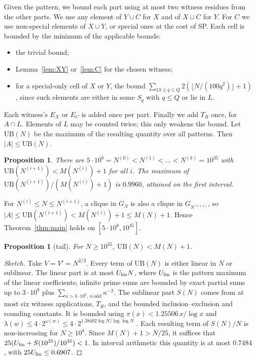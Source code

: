 \documentclass[11pt]{amsart}
\newtheorem{proposition}[theorem]{Proposition}
\theoremstyle{definition}
\theoremstyle{remark}
\begin{document}
Given the pattern, we bound each part using at most two witness residues from the other parts. We use any
element of $Y\cup C$ for $X$ and of $X\cup C$ for $Y$. For $C$ we use non-special elements of $X\cup Y$, or
special ones at the cost of SP. Each cell is bounded by the minimum of the applicable bounds:
\begin{itemize}
\item the trivial bound;
\item Lemma~\ref{lem:XY} or~\ref{lem:C} for the chosen witness;
\item for a special-only cell of $X$ or $Y$, the bound $\sum_{13\le q\le Q}2(\lfloor N/(100q^2)\rfloor+1)$,
  since such elements are either in some $S_q$ with $q\le Q$ or lie in $L$.
\end{itemize}
Each witness's $E_X$ or $E_C$ is added once per part. Finally we add $T_R$ once, for $A\cap L$. Elements of
$L$ may be counted twice; this only weakens the bound. Let $\mathrm{UB}(N)$ be the maximum of the resulting
quantity over all patterns. Then $|A|\le\mathrm{UB}(N)$.

\begin{proposition}\label{prop:grid}
There are $5\cdot10^8=N^{(0)}<N^{(1)}<\dots<N^{(k)}=10^{35}$ with
$\mathrm{UB}(N^{(i+1)})<M(N^{(i)})+1$ for all $i$. The maximum of
$\mathrm{UB}(N^{(i+1)})/(M(N^{(i)})+1)$ is $0.9960$, attained on the first interval.
\end{proposition}

For $N^{(i)}\le N\le N^{(i+1)}$, a clique in $G_N$ is also a clique in $G_{N^{(i+1)}}$, so
$|A|\le\mathrm{UB}(N^{(i+1)})<M(N^{(i)})+1\le M(N)+1$. Hence Theorem~\ref{thm:main} holds on
$[5\cdot10^8,10^{35}]$.

\begin{proposition}[tail]\label{prop:tail}
For $N\ge10^{35}$, $\mathrm{UB}(N)<M(N)+1$.
\end{proposition}
\begin{proof}[Sketch]
Take $V=V'=N^{2/3}$. Every term of $\mathrm{UB}(N)$ is either linear in $N$ or sublinear. The linear part is at
most $U_{\rm lin}N$, where $U_{\rm lin}$ is the pattern maximum of the linear coefficients; infinite prime sums
are bounded by exact partial sums up to $3\cdot10^8$ plus $\sum_{n>3\cdot10^8,\,n\ \text{odd}}n^{-2}$. The
sublinear part $S(N)$ comes from at most six witness applications, $T_R$, and the bounded inclusion--exclusion
and rounding constants. It is bounded using $\pi(x)<1.25506\,x/\log x$ \cite{RS62} and
$\lambda(w)\le4\cdot2^{\omega(w)}\le4\cdot2^{1.38402\log N/\log\log N}$ \cite{Ro83}. Each resulting term of
$S(N)/N$ is non-increasing for $N\ge10^8$. Since $M(N)+1>N/25$, it suffices that
$25(U_{\rm lin}+S(10^{35})/10^{35})<1$. In interval arithmetic this quantity is at most $0.7484$, with
$25U_{\rm lin}\le0.6907$.
\end{proof}
\end{document}
